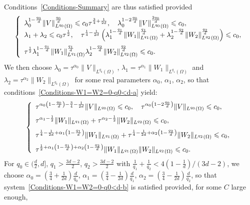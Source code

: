 \documentclass[10pt]{amsart}
\theoremstyle{definition}\newtheorem{defi}[theo]{Definition}\newtheorem{rema}[theo]{Remark}\newtheorem{exam}[theo]{Example}\newtheorem{exem}[theo]{Example}\newtheorem{nota}[theo]{Notation}
\newcommand*\ds{\displaystyle}
\renewcommand{\leq}{\leqslant}
\begin{document}
Conditions~\eqref{Conditions-Summary} are thus satisfied provided
\begin{equation}\label{Conditions-W1=W2=0-q0<d-a}
\left\{
\begin{array}{l}
\ds \lambda_0^{1 - \frac{q_0}{d}} \|V \|_{L^{q_0}(\Omega)}^{\frac{q_0}{d}} \leq c_0 \tau^{\frac{3}{4}+\frac{1}{2d}},
\quad
\lambda_0^{1- 2\frac{q_0}{d}} \|V \|_{L^{q_0}(\Omega)}^{\frac{2q_0}{d}} \leq c_0,
\\[0.15em]
\ds
\lambda_1 + \lambda_2 \leq c_0 \tau^{\frac{1}{2}}, \quad
\tau^{\frac{1}{4}-\frac{1}{2d}} \left(\lambda_1^{1- \frac{q_1}{d}} \| W_{1} \|_{L^{q_1}(\Omega)}^{ \frac{q_1}{d}} + \lambda_2^{1- \frac{q_2}{d}} \| W_{2} \|_{L^{q_2}(\Omega)}^{ \frac{q_2}{d}}\right) \leq c_0,
\medskip
\\
\ds \tau^{\frac{1}{2}} \lambda_1^{1- \frac{q_1}{d}} \| W_{1} \|_{L^{q_1}(\Omega)}^{ \frac{q_1}{d}} \lambda_2^{1- \frac{q_2}{d}} \| W_{2} \|_{L^{q_2}(\Omega)}^{ \frac{q_2}{d}} \leq c_0.
\end{array}\right.
\end{equation}
We then choose $\lambda_0 = \tau^{\alpha_0} \| V\|_{L^{q_0}(\Omega)}$, $\lambda_1 = \tau^{\alpha_1} \| W_1 \|_{L^{q_1}(\Omega)}$ and $\lambda_2 = \tau^{\alpha_2} \| W_2 \|_{L^{q_2}(\Omega)}$ for some real parameters $\alpha_0,\, \alpha_1, \, \alpha_2$, so that conditions~\eqref{Conditions-W1=W2=0-q0<d-a} yield:
\begin{equation}\label{Conditions-W1=W2=0-q0<d-b}
\left\{
\begin{array}{l}
\ds
\tau^{\alpha_0\left(1 - \frac{q_0}{d}\right)-\frac{3}{4} - \frac{1}{2d}} \|V \|_{L^{q_0}(\Omega)} \leq c_0,
\quad
\tau^{\alpha_0\left(1 - 2 \frac{q_0}{d}\right)} \|V \|_{L^{q_0}(\Omega)} \leq c_0,
\medskip
\\
\ds
\tau^{\alpha_1 - \frac{1}{2}} \| W_1\|_{L^{q_1}(\Omega)} + \tau^{\alpha_2 - \frac{1}{2}} \| W_2\|_{L^{q_2}(\Omega)} \leq c_0, \quad
\medskip
\\
\ds \tau^{\frac{1}{4}-\frac{1}{2d} + \alpha_1\left(1- \frac{q_1}{d}\right)} \| W_{1} \|_{L^{q_1}(\Omega)} +
\tau^{\frac{1}{4}-\frac{1}{2d} + \alpha_2\left(1- \frac{q_2}{d}\right)} \| W_{2} \|_{L^{q_2}(\Omega)}
\leq c_0,
\medskip
\\
\ds
\tau^{\frac{1}{2}+ \alpha_1\left(1- \frac{q_1}{d}\right)+ \alpha_2\left(1- \frac{q_2}{d}\right)} \| W_{1} \|_{L^{q_1}(\Omega)} \| W_{2} \|_{L^{q_2}(\Omega)} \leq c_0.
\end{array}\right.
\end{equation}
For $q_0 \in (\frac{d}{2}, d]$, $q_1 > \frac{3d-2}{2} $, $q_2 > \frac{3d-2}{2} $ with $\frac{1}{q_1} +\frac{1}{q_2} < 4(1-\frac{1}{d})/(3d -2)$, we choose $\alpha_0 = (\frac{3}{4} + \frac{1}{2d})\frac{d}{q_0}$, $\alpha_1 = (\frac{3}{4} - \frac{1}{2d}) \frac{d}{q_1}$, $\alpha_2 = (\frac{3}{4} - \frac{1}{2d}) \frac{d}{q_2}$, so that system~\eqref{Conditions-W1=W2=0-q0<d-b} is satisfied provided, for some $C$ large enough,
\end{document}
